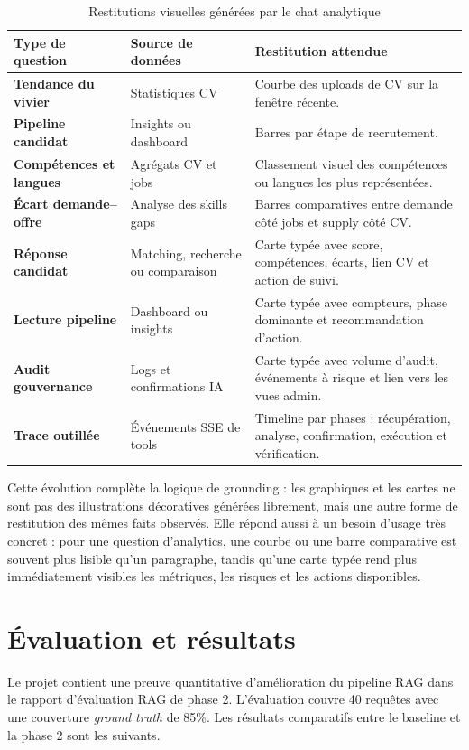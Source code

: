 \begin{table}[H]
  \centering
  \caption{Restitutions visuelles générées par le chat analytique}
  \begin{tabularx}{\textwidth}{>{\bfseries}p{3.2cm}p{3.6cm}X}
    \toprule
    Type de question & Source de données & Restitution attendue \\
    \midrule
    Tendance du vivier & Statistiques CV & Courbe des uploads de CV sur la fenêtre récente. \\
    Pipeline candidat & Insights ou dashboard & Barres par étape de recrutement. \\
    Compétences et langues & Agrégats CV et jobs & Classement visuel des compétences ou langues les plus représentées. \\
    Écart demande--offre & Analyse des skills gaps & Barres comparatives entre demande côté jobs et supply côté CV. \\
    Réponse candidat & Matching, recherche ou comparaison & Carte typée avec score, compétences, écarts, lien CV et action de suivi. \\
    Lecture pipeline & Dashboard ou insights & Carte typée avec compteurs, phase dominante et recommandation d'action. \\
    Audit gouvernance & Logs et confirmations IA & Carte typée avec volume d'audit, événements à risque et lien vers les vues admin. \\
    Trace outillée & Événements SSE de tools & Timeline par phases : récupération, analyse, confirmation, exécution et vérification. \\
    \bottomrule
  \end{tabularx}
\end{table}

Cette évolution complète la logique de grounding : les graphiques et les cartes ne sont pas des illustrations décoratives générées librement, mais une autre forme de restitution des mêmes faits observés. Elle répond aussi à un besoin d'usage très concret : pour une question d'analytics, une courbe ou une barre comparative est souvent plus lisible qu'un paragraphe, tandis qu'une carte typée rend plus immédiatement visibles les métriques, les risques et les actions disponibles.

\section{Évaluation et résultats}
Le projet contient une preuve quantitative d'amélioration du pipeline RAG dans le rapport d'évaluation RAG de phase 2. L'évaluation couvre 40 requêtes avec une couverture \textit{ground truth} de 85\%. Les résultats comparatifs entre le baseline et la phase 2 sont les suivants.

